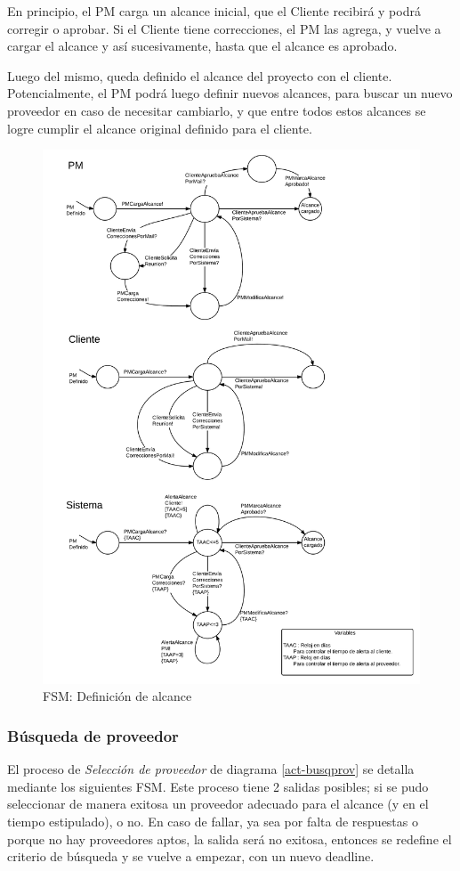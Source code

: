 En principio, el PM carga un alcance inicial, que el Cliente recibirá y podrá 
corregir o aprobar. Si el Cliente tiene correcciones, el PM las agrega, y vuelve 
a cargar el alcance y así sucesivamente, hasta que el alcance es aprobado. 

Luego del mismo, queda definido el alcance del proyecto con el cliente. 
Potencialmente, el PM podrá luego definir nuevos alcances, para buscar un nuevo 
proveedor en caso de necesitar cambiarlo, y que entre todos estos alcances 
se logre cumplir el alcance original definido para el cliente. 

\begin{figure}[H]
\centering
\includegraphics[width=0.8\linewidth]{diag/nuevos/fsm-alcance.png}
\caption{FSM: Definición de alcance}
\label{fsm-alcance}
\end{figure}


		\subsubsection{Búsqueda de proveedor}
El proceso de \textit{Selección de proveedor} de diagrama \ref{act-busqprov} se detalla mediante 
los siguientes FSM. Este proceso tiene 2 salidas posibles; si se pudo seleccionar de 
manera exitosa un proveedor adecuado para el alcance (y en el tiempo estipulado), 
o no. En caso de fallar, ya sea 
por falta de respuestas o porque no hay proveedores aptos, la salida será no exitosa, 
entonces se redefine el criterio de búsqueda y se vuelve a empezar, con un nuevo deadline. 

